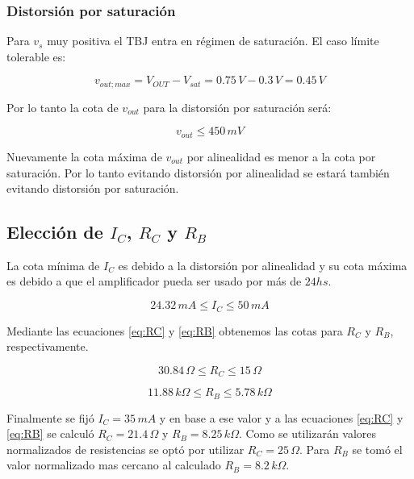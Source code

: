 \documentclass[10pt,spanish,a4paper,openany,notitlepage]{article}
\begin{document}
\subsubsection{Distorsión por saturación}

Para $v_s$ muy positiva el TBJ entra en régimen de saturación. El caso
límite tolerable es:

\[ \displaystyle v_{out;max} = V_{OUT} - V_{sat} = 0.75\, \unit{V} - 0.3\, \unit{V} = 0.45\, \unit{V} \]

Por lo tanto la cota de $v_{out}$ para la distorsión por saturación será:

\begin{equation}
v_{out} \leqslant 450\, \unit{mV}
\label{eq:vout_corte}
\end{equation}

Nuevamente la cota máxima de $v_{out}$ por alinealidad es menor a la cota por saturación.
Por lo tanto evitando distorsión por alinealidad se estará también evitando
distorsión por saturación.

\subsection{Elección de $I_C$, $R_C$ y $R_B$}

La cota mínima de $I_C$ es debido a la distorsión por alinealidad y
su cota máxima es debido a que el amplificador pueda ser usado por más
de $24 \unit{hs}$.

\begin{equation}
24.32\, \unit{mA}\leqslant I_C \leqslant 50\, \unit{mA}
\label{eq:IC_cotas}
\end{equation}

Mediante las ecuaciones \ref{eq:RC} y \ref{eq:RB} obtenemos las cotas para $R_C$
y $R_B$, respectivamente.

\begin{equation}
30.84\, \unit{\Omega}\leqslant R_C \leqslant 15\, \unit{\Omega}
\label{eq:RC_cotas}
\end{equation}

\begin{equation}
11.88\, \unit{k\Omega}\leqslant R_B \leqslant 5.78\, \unit{k\Omega}
\label{eq:RB_cotas}
\end{equation}

Finalmente se fijó $I_C = 35\, \unit{mA}$ y en base a ese valor
y a las ecuaciones \ref{eq:RC} y \ref{eq:RB} se calculó $R_C = 21.4\, \unit{\Omega}$ y $R_B = 8.25\, \unit{k\Omega}$.
Como se utilizarán valores normalizados de resistencias se optó por
utilizar $R_C = 25\, \unit{\Omega}$. Para $R_B$ se tomó el valor
normalizado mas cercano al calculado $R_B = 8.2\, \unit{k\Omega}$.
\end{document}
